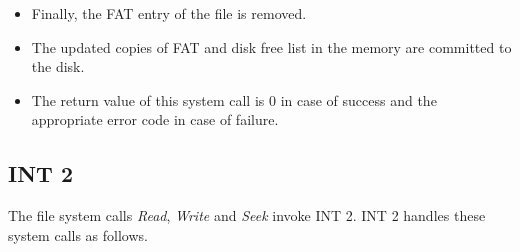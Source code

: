 \begin{enumerate}
\begin{itemize}
		\item Finally, the FAT entry of the file is removed.
		
		\item The updated copies of FAT  and disk free list  in the memory are committed to the disk.
		
		\item The return value of this system call is 0 in case of success and the appropriate error code in case of failure.
	\end{itemize}
\end{enumerate}

\subsection{INT 2}
The file system calls \textit{Read}, \textit{Write} and \textit{Seek} invoke INT 2. INT 2 handles these system calls as follows.
